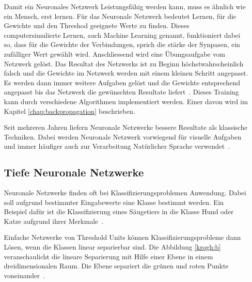 Damit ein Neuronales Netzwerk Leistungsfähig werden kann, muss es ähnlich wie ein Mensch, erst lernen. Für das Neuronale Netzwerk bedeutet Lernen, für die Gewichte und den Threshod geeignete Werte zu finden. Dieses computersimulierte Lernen, auch Machine Learning genannt, funktioniert dabei so, dass für die Gewichte der Verbindungen, sprich die stärke der Synpasen, ein zufälliger Wert gewählt wird. Anschliessend wird eine Übungsaufgabe vom Netzwerk gelöst. Das Resultat des Netzwerks ist zu Beginn höchstwahrscheinlich falsch und die Gewichte im Netzwerk werden mit einem kleinen Schritt angepasst. Es werden dann immer weitere Aufgaben gelöst und die Gewichte entsprechend angepasst bis das Netzwerk die gewünschten Resultate liefert~\autocite{Krogh2008}.
Dieses Training kann durch verschiedene Algorithmen implementiert werden. Einer davon wird im Kapitel \ref{chap:backpropagation} beschrieben.

Seit mehreren Jahren liefern Neuronale Netzwerke bessere Resultate als klassische Techniken. Dabei werden Neuronale Netzwerk vorwiegend für visuelle Aufgaben und immer häufiger auch zur Verarbeitung Natürlicher Sprache verwendet~\autocite{Olah2014b}.



\subsection{Tiefe Neuronale Netzwerke}

Neuronale Netzwerke finden oft bei Klassifizierungsproblemen Anwendung. Dabei soll aufgrund bestimmter Eingabewerte eine Klasse bestimmt werden. Ein Beispiel dafür ist die Klassifizierung eines Säugetiers in die Klasse Hund oder Katze aufgrund ihrer Merkmale~\autocite{Krogh2008}.

Einfache Netzwerke von Threshold Units können Klassifizierungsprobleme dann Lösen, wenn die Klassen linear separierbar sind. Die Abbildung \ref{krogh:b} veranschaulicht die lineare Separierung mit Hilfe einer Ebene in einem dreidimensionalen Raum. Die Ebene separiert die grünen und roten Punkte voneinander~\autocite{Krogh2008}.

